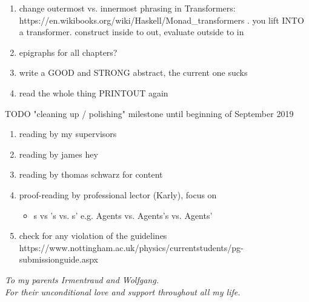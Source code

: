 \documentclass[oneside]{book}
\begin{document}
\begin{enumerate}
	\item change outermost vs. innermost phrasing in Transformers: https://en.wikibooks.org/wiki/Haskell/Monad_transformers	. you lift INTO a transformer. construct inside to out, evaluate outside to in
	
	\item epigraphs for all chapters?

	\item write a GOOD and STRONG abstract, the current one sucks
	
	\item read the whole thing PRINTOUT again
\end{enumerate}

TODO "cleaning up / polishing" milestone until beginning of September 2019
\begin{enumerate}
	\item reading by my supervisors

	\item reading by james hey
	
	\item reading by thomas schwarz for content
		
	\item proof-reading by professional lector (Karly), focus on 
	\begin{itemize}
		\item s vs 's vs. s' e.g. Agents vs. Agents's vs. Agents'
	\end{itemize}
	
	\item check for any violation of the guidelines https://www.nottingham.ac.uk/physics/currentstudents/pg-submissionguide.aspx
\end{enumerate}

\clearpage
\begin{center}
    \thispagestyle{empty}
    \vspace*{\fill}
    \textit{To my parents Irmentraud and Wolfgang. \\ For their unconditional love and support throughout all my life.}
    \vspace*{\fill}
\end{center}

\clearpage


\epigraphhead[450]{}
\end{document}
